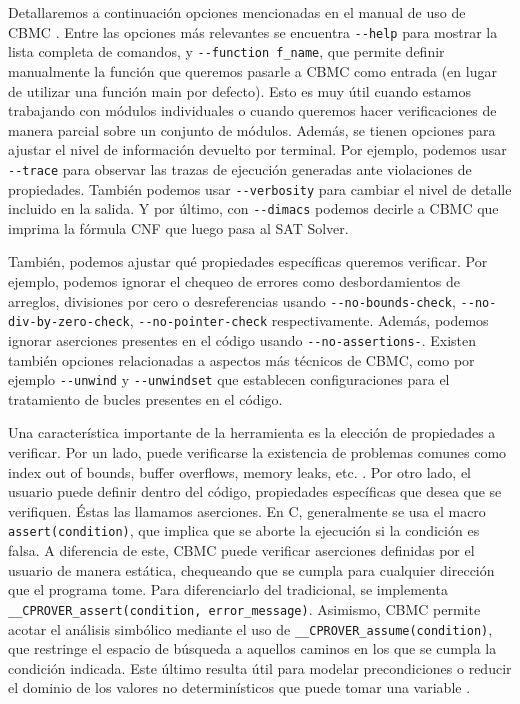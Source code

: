 \documentclass[runningheads]{llncs}
\begin{document}
Detallaremos a continuación opciones mencionadas en el manual de uso de CBMC \cite{cbmc-manual}.
Entre las opciones más relevantes se encuentra \verb|--help| para mostrar la lista completa de comandos, y \verb|--function f_name|, que permite definir manualmente la función que queremos pasarle a CBMC como entrada (en lugar de utilizar una función main por defecto).
Esto es muy útil cuando estamos trabajando con módulos individuales o cuando queremos hacer verificaciones de manera parcial sobre un conjunto de módulos.
Además, se tienen opciones para ajustar el nivel de información devuelto por terminal.
Por ejemplo, podemos usar \verb|--trace| para observar las trazas de ejecución generadas ante violaciones de propiedades.
También podemos usar \verb|--verbosity| para cambiar el nivel de detalle incluido en la salida.
Y por último, con \verb|--dimacs| podemos decirle a CBMC que imprima la fórmula CNF que luego pasa al SAT Solver.

También, podemos ajustar qué propiedades específicas queremos verificar.
Por ejemplo, podemos ignorar el chequeo de errores como desbordamientos de arreglos, divisiones por cero o desreferencias usando \verb|--no-bounds-check|, \verb|--no-div-by-zero-check|, \verb|--no-pointer-check| respectivamente.
Además, podemos ignorar aserciones presentes en el código usando \verb|--no-assertions-|.
Existen también opciones relacionadas a aspectos más técnicos de CBMC, como por ejemplo \verb|--unwind| y \verb|--unwindset| que establecen configuraciones para el tratamiento de bucles presentes en el código.

Una característica importante de la herramienta es la elección de propiedades a verificar.
Por un lado, puede verificarse la existencia de problemas comunes como index out of bounds, buffer overflows, memory leaks, etc. \cite{cbmc-paper}.
Por otro lado, el usuario puede definir dentro del código, propiedades específicas que desea que se verifiquen. Éstas las llamamos aserciones.
En C, generalmente se usa el macro \verb|assert(condition)|, que implica que se aborte la ejecución si la condición es falsa.
A diferencia de este, CBMC puede verificar aserciones definidas por el usuario de manera estática, chequeando que se cumpla para cualquier dirección que el programa tome.
Para diferenciarlo del tradicional, se implementa \verb|__CPROVER_assert(condition, error_message)|.
Asimismo, CBMC permite acotar el análisis simbólico mediante el uso de \verb|__CPROVER_assume(condition)|, que restringe el espacio de búsqueda a aquellos caminos en los que se cumpla la condición indicada.
Este último resulta útil para modelar precondiciones o reducir el dominio de los valores no determinísticos que puede tomar una variable \cite{cbmc-paper}.
\end{document}

